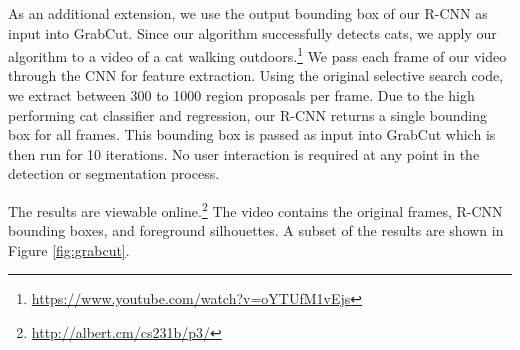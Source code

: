 \documentclass[10pt,twocolumn,letterpaper]{article}
\begin{document}
As an additional extension, we use the output bounding box of our R-CNN as input into GrabCut. Since our algorithm successfully detects cats, we apply our algorithm to a video of a cat walking outdoors.\footnote{\url{https://www.youtube.com/watch?v=oYTUfM1vEjs}} We pass each frame of our video through the CNN for feature extraction. Using the original selective search code, we extract between 300 to 1000 region proposals per frame. Due to the high performing cat classifier and regression, our R-CNN returns a single bounding box for all frames. This bounding box is passed as input into GrabCut which is then run for 10 iterations. No user interaction is required at any point in the detection or segmentation process.


The results are viewable online.\footnote{\url{http://albert.cm/cs231b/p3/}} The video contains the original frames, R-CNN bounding boxes, and foreground silhouettes. A subset of the results are shown in Figure \ref{fig:grabcut}.


{\small


}
\end{document}
